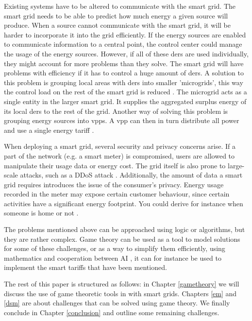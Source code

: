 Existing systems have to be altered to communicate with the smart grid. The smart grid needs to be able to predict how much energy a given source will produce. When a source cannot communicate with the smart grid, it will be harder to incorporate it into the grid efficiently. If the energy sources are enabled to communicate information to a central point, the control center could manage the usage of the energy sources. However, if all of these \acp{der} are used individually, they might account for more problems than they solve. The smart grid will have problems with efficiency if it has to control a huge amount of \acp{der}. A solution to this problem is grouping local areas with \acp{der} into smaller 'microgrids', this way the control load on the rest of the smart grid is reduced \cite{HatziargyriouAsanoIravaniMarnay2007}. The microgrid acts as a single entity in the larger smart grid. It supplies the aggregated surplus energy of its local \acp{der} to the rest of the grid. Another way of solving this problem is grouping energy sources into \acp{vpp}. A \ac{vpp} can then in turn distribute all power and use a single energy tariff \cite{NikonowiczMilewski2012}.

When deploying a smart grid, several security and privacy concerns arise.  If a part of the network (e.g. a smart meter) is compromised, users are allowed to manipulate their usage data or energy cost. The grid itself is also prone to large-scale attacks, such as a DDoS attack \cite{McDanielMcLaughlin2009a}. Additionally, the amount of data a smart grid requires introduces the issue of the consumer's privacy. Energy usage recorded in the meter may expose certain customer behaviour, since certain activities have a significant energy footprint. You could derive for instance when someone is home or not \cite{Molina-MarkhamShenoyFuEtAl2010}.

The problems mentioned above can be approached using logic or algorithms, but they are rather complex. Game theory can be used as a tool to model solutions for some of these challenges, or as a way to simplify them efficiently, using mathematics and cooperation between AI \cite{myerson2013game}, it can for instance be used to implement the smart tariffs that have been mentioned. 

The rest of this paper is structured as follows: in Chapter \ref{gametheory} we will discuss the use of game theoretic tools in with smart grids. Chapters \ref{em} and \ref{dsm} are about challenges that can be solved using game theory. We finally conclude in Chapter \ref{conclusion} and outline some remaining challenges.